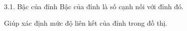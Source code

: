 \documentclass{beamer}
\begin{document}
\begin{frame}{3.1. Bậc của đỉnh}
\Large
Bậc của đỉnh là số cạnh nối với đỉnh đó.

\vspace{0.3cm}
Giúp xác định mức độ liên kết của đỉnh trong đồ thị.
\end{frame}
\end{document}
